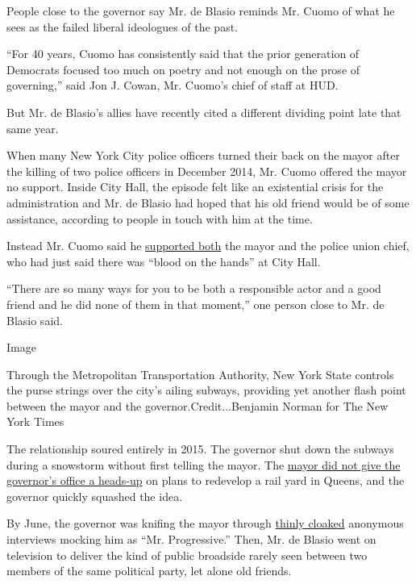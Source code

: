 People close to the governor say Mr. de Blasio reminds Mr. Cuomo of what
he sees as the failed liberal ideologues of the past.

``For 40 years, Cuomo has consistently said that the prior generation of
Democrats focused too much on poetry and not enough on the prose of
governing,'' said Jon J. Cowan, Mr. Cuomo's chief of staff at HUD.

But Mr. de Blasio's allies have recently cited a different dividing
point late that same year.

When many New York City police officers turned their back on the mayor
after the killing of two police officers in December 2014, Mr. Cuomo
offered the mayor no support. Inside City Hall, the episode felt like an
existential crisis for the administration and Mr. de Blasio had hoped
that his old friend would be of some assistance, according to people in
touch with him at the time.

Instead Mr. Cuomo said he
\href{http://observer.com/2014/12/cuomo-refuses-to-condemn-lynch-for-claiming-de-blasio-has-blood-on-his-hands/}{supported
both} the mayor and the police union chief, who had just said there was
``blood on the hands'' at City Hall.

``There are so many ways for you to be both a responsible actor and a
good friend and he did none of them in that moment,'' one person close
to Mr. de Blasio said.

Image

Through the Metropolitan Transportation Authority, New York State
controls the purse strings over the city's ailing subways, providing yet
another flash point between the mayor and the governor.Credit...Benjamin
Norman for The New York Times

The relationship soured entirely in 2015. The governor shut down the
subways during a snowstorm without first telling the mayor. The
\href{https://www.nytimes3xbfgragh.onion/2015/02/12/nyregion/for-cuomo-and-de-blasio-the-tension-comes-easily.html}{mayor
did not give the governor's office a heads-up} on plans to redevelop a
rail yard in Queens, and the governor quickly squashed the idea.

By June, the governor was knifing the mayor through
\href{http://newyork.cbslocal.com/2015/06/25/cuomo-de-blasio-feud/}{thinly
cloaked} anonymous interviews mocking him as ``Mr. Progressive.'' Then,
Mr. de Blasio went on television to deliver the kind of public broadside
rarely seen between two members of the same political party, let alone
old friends.

